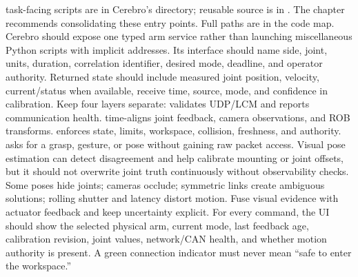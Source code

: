 {}
\markdownRendererSectionEnd \markdownRendererSectionBegin
{}\markdownRendererInterblockSeparator
{}\markdownRendererBlockQuoteBegin
{} task-facing scripts are in Cerebro's  directory; reusable source is in . The chapter recommends consolidating these entry points. Full paths are in the code map.\markdownRendererBlockQuoteEnd \markdownRendererInterblockSeparator
{}Cerebro should expose one typed arm service rather than launching miscellaneous Python scripts with implicit addresses. Its interface should name side, joint, units, duration, correlation identifier, desired mode, deadline, and operator authority. Returned state should include measured joint position, velocity, current/status when available, receive time, source, mode, and confidence in calibration.\markdownRendererParagraphSeparator
{}Keep four layers separate:\markdownRendererInterblockSeparator
{}\markdownRendererOlBegin
{} validates UDP/LCM and reports communication health.\markdownRendererOlItemEnd 
{} time-aligns joint feedback, camera observations, and ROB transforms.\markdownRendererOlItemEnd 
{} enforces state, limits, workspace, collision, freshness, and authority.\markdownRendererOlItemEnd 
{} asks for a grasp, gesture, or pose without gaining raw packet access.\markdownRendererOlItemEnd 
\markdownRendererOlEnd \markdownRendererInterblockSeparator
{}Visual pose estimation can detect disagreement and help calibrate mounting or joint offsets, but it should not overwrite joint truth continuously without observability checks. Some poses hide joints; cameras occlude; symmetric links create ambiguous solutions; rolling shutter and latency distort motion. Fuse visual evidence with actuator feedback and keep uncertainty explicit.\markdownRendererParagraphSeparator
{}For every command, the UI should show the selected physical arm, current mode, last feedback age, calibration revision, joint values, network/CAN health, and whether motion authority is present. A green connection indicator must never mean “safe to enter the workspace.”\markdownRendererInterblockSeparator
